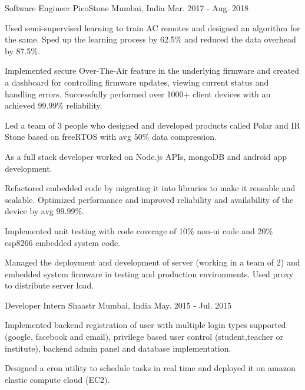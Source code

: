 

\begin{cventries}

	\cventry
	{Software Engineer} %
	{PicoStone} %
	{Mumbai, India} %
	{Mar. 2017 - Aug. 2018} %
	{ \begin{cvitems} %
	\item{Used semi-supervised learning to train AC remotes and designed an algorithm for the same. Sped up the learning process by 62.5\% and reduced the data overhead by 87.5\%.} %
      \item {Implemented secure Over-The-Air feature in the underlying firmware and created a dashboard for controlling firmware updates, viewing current status and handling errors. Successfully performed over 1000+ client devices with an achieved 99.99\% reliability.}
      \item {Led a team of 3 people who designed and developed products called Polar and IR Stone based on freeRTOS with avg 50\% data compression.}  %
      \item {As a full stack developer worked on Node.js APIs, mongoDB and android app development.}    
      \item {Refactored embedded code by migrating it into libraries to make it reusable and scalable. Optimized performance and improved reliability and availability of the device by avg 99.99\%.}  %
      \item {Implemented unit testing with code coverage of 10\% non-ui code and 20\% esp8266 embedded system code.}
      \item {Managed the deployment and development of server (working in a team of 2) and embedded system firmware in testing and production environments. Used proxy to distribute server load.}
     \end{cvitems}
  }


	\cventry
	{Developer Intern} %
	{Shaastr } %
	{Mumbai, India} %
	{May. 2015 - Jul. 2015} %
	{
		\begin{cvitems} %
			\item {Implemented backend registration of user with multiple login types supported (google, facebook and email), privilege based user control (student,teacher or institute), backend admin panel and database implementation.}
			\item {Designed a cron utility to schedule tasks in real time and deployed it on amazon elastic compute cloud (EC2).}
		\end{cvitems}
	}

\end{cventries}